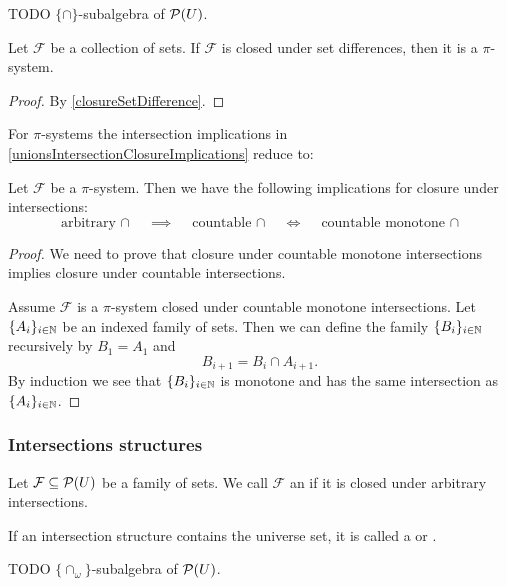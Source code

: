 TODO $\{\cap\}$-subalgebra of $\operatorname{\mathcal{P}}(U)$.

\begin{lemma}
Let $\mathcal{F}$ be a collection of sets. If $\mathcal{F}$ is closed under set differences, then it is a $\pi$-system.
\end{lemma}
\begin{proof}
By \ref{closureSetDifference}.
\end{proof}

For $\pi$-systems the intersection implications in \ref{unionsIntersectionClosureImplications} reduce to:
\begin{lemma} \label{piSystemunionsIntersectionClosureImplications}
Let $\mathcal{F}$ be a $\pi$-system. Then we have the following implications for closure under intersections:
\[ \text{arbitrary $\cap$} \quad\implies\quad \text{countable $\cap$} \quad\iff\quad \text{countable monotone $\cap$} \]
\end{lemma}
\begin{proof}
We need to prove that closure under countable monotone intersections implies closure under countable intersections.

Assume $\mathcal{F}$ is a $\pi$-system closed under countable monotone intersections. Let $\{A_i\}_{i\in \mathbb{N}}$ be an indexed family of sets. Then we can define the family $\{B_i\}_{i\in \mathbb{N}}$ recursively by $B_1 = A_1$ and
\[ B_{i+1} = B_i \cap A_{i+1}. \]
By induction we see that $\{B_i\}_{i\in \mathbb{N}}$ is monotone and has the same intersection as $\{A_i\}_{i\in \mathbb{N}}$.
\end{proof}

\subsubsection{Intersections structures}
\begin{definition}
Let $\mathcal{F} \subseteq \operatorname{\mathcal{P}}(U)$ be a family of sets. We call $\mathcal{F}$ an  if it is closed under arbitrary intersections.

If an intersection structure contains the universe set, it is called a  or .
\end{definition}

TODO $\{\cap_{\omega}\}$-subalgebra of $\operatorname{\mathcal{P}}(U)$.

